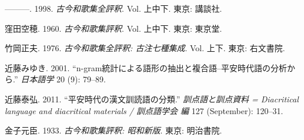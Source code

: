\documentclass[
  letterpaper,
  DIV=11,
  numbers=noendperiod]{scrartcl}
\newlength{\cslhangindent}
\newenvironment{CSLReferences}[2] %
 {\begin{list}{}{%
  \setlength{\itemindent}{0pt}
  \setlength{\leftmargin}{0pt}
  \setlength{\parsep}{0pt}
  \ifodd #1
   \setlength{\leftmargin}{\cslhangindent}
   \setlength{\itemindent}{-1\cslhangindent}
  \fi
  \setlength{\itemsep}{#2\baselineskip}}}
 {\end{list}}
\begin{document}
\begin{CSLReferences}{1}{0}
---------. 1998. \emph{{古今和歌集全評釈}}. Vol. 上中下. 東京: 講談社.

窪田空穂. 1960. \emph{古今和歌集評釈}. Vol. 上中下. 東京: 東京堂.

竹岡正夫. 1976. \emph{{古今和歌集全評釈: 古注七種集成}}. Vol. 上下.
東京: 右文書院.

近藤みゆき. 2001.
{``{n-gram統計による語形の抽出と複合語--平安時代語の分析から}.''}
\emph{日本語学} 20 (9): 79--89.

近藤泰弘. 2011. {``{平安時代の漢文訓読語の分類}.''}
\emph{訓点語と訓点資料 = Diacritical language and diacritical materials
/ 訓点語学会 編} 127 (September): 120--31.

金子元臣. 1933. \emph{古今和歌集評釈: 昭和新版}. 東京: 明治書院.

\end{CSLReferences}
\end{document}
